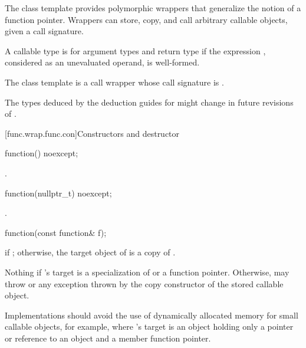\pnum
The  class template provides polymorphic wrappers that
generalize the notion of a function pointer. Wrappers can store, copy,
and call arbitrary callable objects, given a call
signature.

\pnum
{}%
A callable type 
is  for argument
types 
and return type 
if the expression
,
considered as an unevaluated operand, is
well-formed.

\pnum
The  class template is a call
wrapper whose call signature
is .

\pnum
\begin{note}
The types deduced by the deduction guides for 
might change in future revisions of \Cpp{}.
\end{note}

[func.wrap.func.con]{Constructors and destructor}

%
\begin{itemdecl}
function() noexcept;
\end{itemdecl}

\begin{itemdescr}
\pnum
\ensures
{}.
\end{itemdescr}

%
\begin{itemdecl}
function(nullptr_t) noexcept;
\end{itemdecl}

\begin{itemdescr}
\pnum
\ensures
{}.
\end{itemdescr}

%
\begin{itemdecl}
function(const function& f);
\end{itemdecl}

\begin{itemdescr}
\pnum
\ensures
{} if ; otherwise,
the target object of  is a copy of .

\pnum
\throws
Nothing if 's target is
a specialization of  or
a function pointer. Otherwise, may throw 
or any exception thrown by the copy constructor of the stored callable object.

\pnum
\recommended
Implementations should avoid the use of
dynamically allocated memory for small callable objects, for example, where
's target is an object holding only a pointer or reference
to an object and a member function pointer.
\end{itemdescr}

